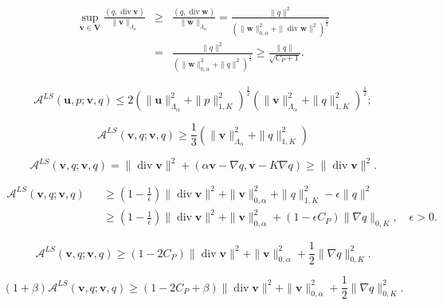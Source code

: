 \documentclass[11pt]{article}
\begin{document}
\begin{eqnarray*}
\sup_{{{\mathbf v}}\in {{\boldsymbol V}}} \frac{(q,{\operatorname{div}} {{\mathbf v}})}{\|{{\mathbf v}}\|_{\Lambda_\alpha}} &\ge &
\frac{(q,{\operatorname{div}} {{\mathbf w}})}{\|{{\mathbf w}}\|_{\Lambda_\alpha}}=  
\frac{\|q\|^2}{ (\|{{\mathbf w}}\|_{0,\alpha}^2+\|{\operatorname{div}} {{\mathbf w}}\|^2)^\frac12}\\
& = & 
\frac{\|q\|^2}{( \|{{\mathbf w}}\|_{0,\alpha}^2+\|q\|^2)^\frac12}
\ge \frac{\|q\|}{\sqrt{C_P+1}}.
\end{eqnarray*}

\begin{equation}\label{continuity_LS}
{{\mathcal A}}^{LS}({{\mathbf u}},p; {{\mathbf v}},q) 
\le 2( \|{{\mathbf u}}\|^2_{\Lambda_{{\alpha}}} +\|p\|^2_{1,K})^\frac12( \|{{\mathbf v}}\|^2_{\Lambda_{{\alpha}}} +\|q\|^2_{1,K})^\frac12;
\end{equation}

\begin{equation}\label{A-coercivity}
{{\mathcal A}}^{LS}({{\mathbf v}},q; {{\mathbf v}},q) 
\ge \frac13 ( \|{{\mathbf v}}\|^2_{\Lambda_{{\alpha}}} +\|q\|^2_{1,K})
\end{equation}

\begin{equation}\label{div_bound}
{{\mathcal A}}^{LS}({{\mathbf v}},q; {{\mathbf v}},q)  = \|{\operatorname{div}} {{\mathbf v}} \|^2 + (\alpha {{\mathbf v}} - \nabla q, {{\mathbf v}} - K \nabla q) 
\ge \|{\operatorname{div}} {{\mathbf v}} \|^2.
\end{equation}

\begin{eqnarray*}
{{\mathcal A}}^{LS}({{\mathbf v}},q; {{\mathbf v}},q)   &&  \ge  (1-\frac{1}{\epsilon})\|{\operatorname{div}} {{\mathbf v}}\|^2  +  
\|{{\mathbf v}}\|_{0,\alpha}^2 + \|q\|^2_{1,K} - \epsilon \|q \|^2 \\
 &&   \ge (1-\frac{1}{\epsilon})\|{\operatorname{div}} {{\mathbf v}} \|^2 
+ \|{{\mathbf v}}\|^2_{0,\alpha} + (1 - \epsilon C_P)\|\nabla q\|_{0,K}, \quad \epsilon >0.
\end{eqnarray*}

$$
{{\mathcal A}}^{LS}({{\mathbf v}},q; {{\mathbf v}},q) \ge (1-2 C_P)\|{\operatorname{div}} {{\mathbf v}} \|^2 
+ \|{{\mathbf v}}\|_{0,\alpha}^2 + \frac12 \|\nabla q\|_{0,K}^2.
$$

$$
(1+ \beta) {{\mathcal A}}^{LS}({{\mathbf v}},q; {{\mathbf v}},q) \ge ( 1-2 C_P + \beta) \|{\operatorname{div}} {{\mathbf v}} \|^2 
+ \|{{\mathbf v}}\|^2_{0,\alpha} + \frac12 \|\nabla q\|_{0,K}^2.
$$
\end{document}
